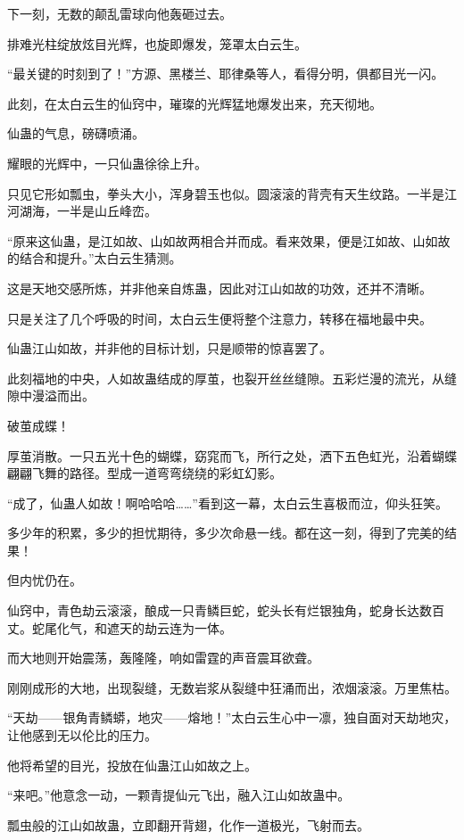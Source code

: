 \begin{this_body}
下一刻，无数的颠乱雷球向他轰砸过去。

排难光柱绽放炫目光辉，也旋即爆发，笼罩太白云生。

“最关键的时刻到了！”方源、黑楼兰、耶律桑等人，看得分明，俱都目光一闪。

此刻，在太白云生的仙窍中，璀璨的光辉猛地爆发出来，充天彻地。

仙蛊的气息，磅礴喷涌。

耀眼的光辉中，一只仙蛊徐徐上升。

只见它形如瓢虫，拳头大小，浑身碧玉也似。圆滚滚的背壳有天生纹路。一半是江河湖海，一半是山丘峰峦。

“原来这仙蛊，是江如故、山如故两相合并而成。看来效果，便是江如故、山如故的结合和提升。”太白云生猜测。

这是天地交感所炼，并非他亲自炼蛊，因此对江山如故的功效，还并不清晰。

只是关注了几个呼吸的时间，太白云生便将整个注意力，转移在福地最中央。

仙蛊江山如故，并非他的目标计划，只是顺带的惊喜罢了。

此刻福地的中央，人如故蛊结成的厚茧，也裂开丝丝缝隙。五彩烂漫的流光，从缝隙中漫溢而出。

破茧成蝶！

厚茧消散。一只五光十色的蝴蝶，窈窕而飞，所行之处，洒下五色虹光，沿着蝴蝶翩翩飞舞的路径。型成一道弯弯绕绕的彩虹幻影。

“成了，仙蛊人如故！啊哈哈哈……”看到这一幕，太白云生喜极而泣，仰头狂笑。

多少年的积累，多少的担忧期待，多少次命悬一线。都在这一刻，得到了完美的结果！

但内忧仍在。

仙窍中，青色劫云滚滚，酿成一只青鳞巨蛇，蛇头长有烂银独角，蛇身长达数百丈。蛇尾化气，和遮天的劫云连为一体。

而大地则开始震荡，轰隆隆，响如雷霆的声音震耳欲聋。

刚刚成形的大地，出现裂缝，无数岩浆从裂缝中狂涌而出，浓烟滚滚。万里焦枯。

“天劫——银角青鳞蟒，地灾——熔地！”太白云生心中一凛，独自面对天劫地灾，让他感到无以伦比的压力。

他将希望的目光，投放在仙蛊江山如故之上。

“来吧。”他意念一动，一颗青提仙元飞出，融入江山如故蛊中。

瓢虫般的江山如故蛊，立即翻开背翅，化作一道极光，飞射而去。


\end{this_body}

